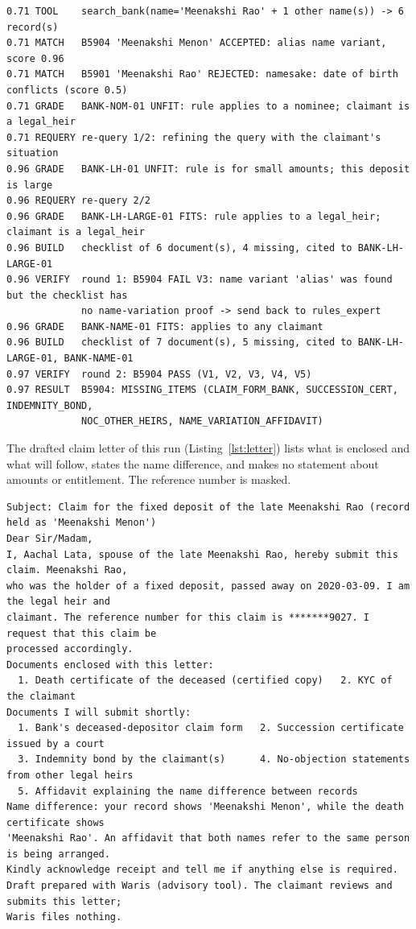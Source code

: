 \begin{lstlisting}[numbers=none,basicstyle=\ttfamily\tiny\setstretch{1.0},caption={Trace of a run with two re-queries and a Verifier send-back (case h19), condensed.},label={lst:h19}]
0.71 TOOL    search_bank(name='Meenakshi Rao' + 1 other name(s)) -> 6 record(s)
0.71 MATCH   B5904 'Meenakshi Menon' ACCEPTED: alias name variant, score 0.96
0.71 MATCH   B5901 'Meenakshi Rao' REJECTED: namesake: date of birth conflicts (score 0.5)
0.71 GRADE   BANK-NOM-01 UNFIT: rule applies to a nominee; claimant is a legal_heir
0.71 REQUERY re-query 1/2: refining the query with the claimant's situation
0.96 GRADE   BANK-LH-01 UNFIT: rule is for small amounts; this deposit is large
0.96 REQUERY re-query 2/2
0.96 GRADE   BANK-LH-LARGE-01 FITS: rule applies to a legal_heir; claimant is a legal_heir
0.96 BUILD   checklist of 6 document(s), 4 missing, cited to BANK-LH-LARGE-01
0.96 VERIFY  round 1: B5904 FAIL V3: name variant 'alias' was found but the checklist has
             no name-variation proof -> send back to rules_expert
0.96 GRADE   BANK-NAME-01 FITS: applies to any claimant
0.96 BUILD   checklist of 7 document(s), 5 missing, cited to BANK-LH-LARGE-01, BANK-NAME-01
0.97 VERIFY  round 2: B5904 PASS (V1, V2, V3, V4, V5)
0.97 RESULT  B5904: MISSING_ITEMS (CLAIM_FORM_BANK, SUCCESSION_CERT, INDEMNITY_BOND,
             NOC_OTHER_HEIRS, NAME_VARIATION_AFFIDAVIT)
\end{lstlisting}

The drafted claim letter of this run (Listing~\ref{lst:letter}) lists what is enclosed and what will follow, states the name difference, and makes no statement about amounts or entitlement. The reference number is masked.

\begin{lstlisting}[numbers=none,basicstyle=\ttfamily\tiny\setstretch{1.0},caption={Claim letter drafted for case h19 (synthetic).},label={lst:letter}]
Subject: Claim for the fixed deposit of the late Meenakshi Rao (record held as 'Meenakshi Menon')
Dear Sir/Madam,
I, Aachal Lata, spouse of the late Meenakshi Rao, hereby submit this claim. Meenakshi Rao,
who was the holder of a fixed deposit, passed away on 2020-03-09. I am the legal heir and
claimant. The reference number for this claim is *******9027. I request that this claim be
processed accordingly.
Documents enclosed with this letter:
  1. Death certificate of the deceased (certified copy)   2. KYC of the claimant
Documents I will submit shortly:
  1. Bank's deceased-depositor claim form   2. Succession certificate issued by a court
  3. Indemnity bond by the claimant(s)      4. No-objection statements from other legal heirs
  5. Affidavit explaining the name difference between records
Name difference: your record shows 'Meenakshi Menon', while the death certificate shows
'Meenakshi Rao'. An affidavit that both names refer to the same person is being arranged.
Kindly acknowledge receipt and tell me if anything else is required.
Draft prepared with Waris (advisory tool). The claimant reviews and submits this letter;
Waris files nothing.
\end{lstlisting}

